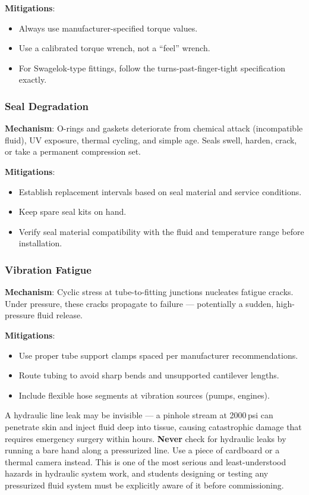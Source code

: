 \documentclass[11pt,letterpaper,twoside,openany]{book}
\begin{document}
\textbf{Mitigations}:
\begin{itemize}[nosep,leftmargin=1.5em]
  \item Always use manufacturer-specified torque values.
  \item Use a calibrated torque wrench, not a ``feel'' wrench.
  \item For Swagelok-type fittings, follow the turns-past-finger-tight specification exactly.
\end{itemize}

\subsubsection{Seal Degradation}

\textbf{Mechanism}: O-rings and gaskets deteriorate from chemical attack (incompatible fluid), UV exposure, thermal cycling, and simple age. Seals swell, harden, crack, or take a permanent compression set.

\textbf{Mitigations}:
\begin{itemize}[nosep,leftmargin=1.5em]
  \item Establish replacement intervals based on seal material and service conditions.
  \item Keep spare seal kits on hand.
  \item Verify seal material compatibility with the fluid and temperature range before installation.
\end{itemize}

\subsubsection{Vibration Fatigue}

\textbf{Mechanism}: Cyclic stress at tube-to-fitting junctions nucleates fatigue cracks. Under pressure, these cracks propagate to failure --- potentially a sudden, high-pressure fluid release.

\textbf{Mitigations}:
\begin{itemize}[nosep,leftmargin=1.5em]
  \item Use proper tube support clamps spaced per manufacturer recommendations.
  \item Route tubing to avoid sharp bends and unsupported cantilever lengths.
  \item Include flexible hose segments at vibration sources (pumps, engines).
\end{itemize}

\begin{warningbox}
A hydraulic line leak may be invisible --- a pinhole stream at 2000\,psi can penetrate skin and inject fluid deep into tissue, causing catastrophic damage that requires emergency surgery within hours. \textbf{Never} check for hydraulic leaks by running a bare hand along a pressurized line. Use a piece of cardboard or a thermal camera instead. This is one of the most serious and least-understood hazards in hydraulic system work, and students designing or testing any pressurized fluid system must be explicitly aware of it before commissioning.
\end{warningbox}
\end{document}
